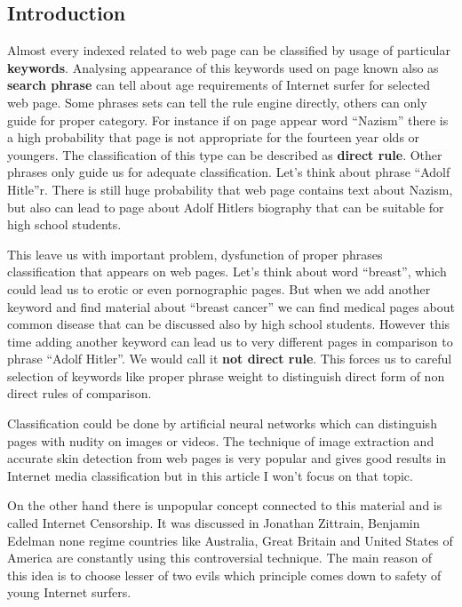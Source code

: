 \documentclass[9pt,a4paper]{extarticle}
\begin{document}
\begin{multicols}{2}
\section{Introduction}
Almost every indexed related to web page can be classified by usage of particular \textbf{keywords}. Analysing appearance of this keywords used on page known also as \textbf{search phrase} can tell about age requirements of Internet surfer for selected web page. Some phrases sets can tell the rule engine directly, others can only guide for proper category. For instance if on page appear word ``Nazism'' there is a high probability that page is not appropriate for the fourteen year olds or youngers. The classification of this type can be described as \textbf{direct rule}. Other phrases only guide us for adequate classification. Let's think about phrase ``Adolf Hitle''r. There is still huge probability that web page contains text about Nazism, but also can lead to page about Adolf Hitlers biography that can be  suitable for high school students.

This leave us with important problem, dysfunction of proper phrases classification that appears on web pages. Let's think about word ``breast'', which could lead us to erotic or even pornographic pages. But when we add another keyword and find material about ``breast cancer'' we can find medical pages about common disease that can be discussed also by high school students. However this time adding another keyword can lead us to very different pages in comparison to phrase ``Adolf Hitler''. We would call it \textbf{not direct rule}. This forces us to careful selection of keywords like proper phrase weight to distinguish direct form of non direct rules of comparison.

Classification could be done by artificial neural networks which can distinguish pages with nudity on images or videos\cite{will_archer_arentz_classifying_nodate, radhouane_guermazi_combining_2007, giuseppe_amato_detection_2009}. The technique of image extraction and accurate skin detection from web pages is very popular and gives good results in Internet media classification\cite{mohammad_reza_mahmoodi_high_nodate,paul_greenfield_netalert_2001} but in this article I won't focus on that topic. 

On the other hand there is unpopular concept connected to this material and  is called Internet Censorship. It was discussed in Jonathan Zittrain, Benjamin Edelman\cite{jonathan_zittrain_internet_2003} none regime countries like Australia, Great Britain and United States of America are constantly using this controversial technique. The main reason of this idea is to choose lesser of two evils which principle comes down to safety of young Internet surfers\cite{piotr_luczuk_cyberwojna_2016,john_g._palfrey_jr._four_2010}.


\end{multicols}
\end{document}
